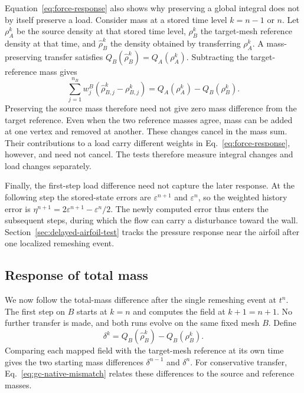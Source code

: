 \documentclass[a4paper,fleqn]{cas-sc}
\newcommand{\eps}{\varepsilon}
\begin{document}
Equation~\eqref{eq:force-response} also shows why preserving a global integral does not by itself preserve a load. Consider mass at a stored time level $k=n-1$ or $n$. Let $\rho_A^k$ be the source density at that stored time level, $\rho_B^k$ the target-mesh reference density at that time, and $\widehat\rho_B^k$ the density obtained by transferring $\rho_A^k$. A mass-preserving transfer satisfies $Q_B(\widehat\rho_B^k)=Q_A(\rho_A^k)$. Subtracting the target-reference mass gives
\begin{equation}
 \sum_{j=1}^{n_B} w_j^B(\widehat\rho_{B,j}^k-\rho_{B,j}^k)
 =Q_A(\rho_A^k)-Q_B(\rho_B^k).
 \label{eq:gc-native-mismatch}
\end{equation}
Preserving the source mass therefore need not give zero mass difference from the target reference. Even when the two reference masses agree, mass can be added at one vertex and removed at another. These changes cancel in the mass sum. Their contributions to a load carry different weights in Eq.~\eqref{eq:force-response}, however, and need not cancel. The tests therefore measure integral changes and load changes separately.

Finally, the first-step load difference need not capture the later response. At the following step the stored-state errors are $\eps^{n+1}$ and $\eps^n$, so the weighted history error is $\eta^{n+1}=2\eps^{n+1}-\eps^n/2$. The newly computed error thus enters the subsequent steps, during which the flow can carry a disturbance toward the wall. Section~\ref{sec:delayed-airfoil-test} tracks the pressure response near the airfoil after one localized remeshing event.

\subsection{Response of total mass}
\label{sec:mass-response}

We now follow the total-mass difference after the single remeshing event at $t^n$. The first step on $B$ starts at $k=n$ and computes the field at $k+1=n+1$. No further transfer is made, and both runs evolve on the same fixed mesh $B$. Define
\[
 \delta^k=Q_B(\widehat\rho_B^k)-Q_B(\rho_B^k).
\]
Comparing each mapped field with the target-mesh reference at its own time gives the two starting mass differences $\delta^{n-1}$ and $\delta^n$. For conservative transfer, Eq.~\eqref{eq:gc-native-mismatch} relates these differences to the source and reference masses.
\end{document}
